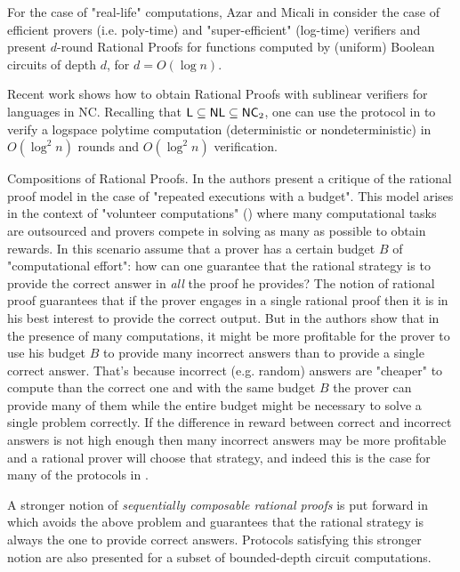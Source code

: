 For the case of "real-life" computations, Azar and Micali in \cite{am1} consider the case of efficient provers (i.e. poly-time) and "super-efficient" (log-time) verifiers and present $d$-round Rational Proofs for functions computed by (uniform) Boolean circuits of depth $d$, for $d=O(\log n)$. 

Recent work \cite{ratsumchecks} shows how to obtain Rational Proofs with sublinear verifiers for languages in NC. Recalling that ${\mathsf{L}} \subseteq {\ensuremath{\mathsf{NL}}} \subseteq {\ensuremath{\mathsf{NC}}}_2$, one can use the protocol  in \cite{ratsumchecks} to verify a logspace polytime computation (deterministic or nondeterministic) in $O(\log^2 n )$ rounds and $O(\log^2 n )$ verification.


\medskip
\noindent
{\sc Compositions of Rational Proofs.}
In \cite{cg15} the authors present a critique of the rational proof model in the case of "repeated executions with a budget". This model arises in the context of "volunteer computations" (\cite{seti,folding}) where many computational tasks are outsourced and provers compete in solving as many as possible to obtain rewards. In this scenario assume that a prover has a certain budget $B$ of "computational effort": how can one  guarantee that the rational strategy is to provide the correct answer in {\em all} the proof he provides? The notion of rational proof guarantees that if the prover engages in a single rational proof then it is in his best interest to provide the correct output. But in \cite{cg15} the authors show that in the presence of many computations, it might be more profitable for the prover to use his budget $B$ to provide many incorrect answers than to provide a single correct answer. That's because incorrect (e.g. random) answers are "cheaper" to compute than the correct one and with the same budget $B$ the prover can provide many of them while the entire budget might be necessary to solve a single problem correctly. If the difference in reward between correct and incorrect answers is not high enough then many incorrect answers may be more profitable and a rational prover will choose that strategy, and indeed this is the case for many of the protocols in \cite{am,am1,ratargs,ratsumchecks}. 

A stronger notion of {\em sequentially composable rational proofs} is put forward in \cite{cg15} which avoids the above problem and guarantees that the rational strategy is always the one to provide correct answers. Protocols satisfying this stronger notion are also presented for a subset of bounded-depth circuit computations. 

